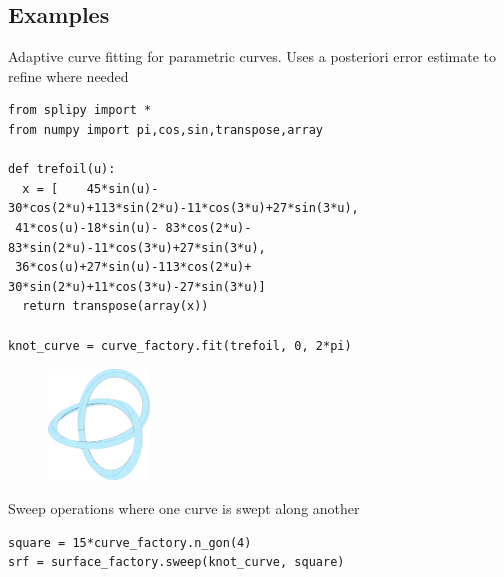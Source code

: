 \documentclass[landscape]{sintefposter}
\begin{document}
\begin{multicols}{3}
\vspace{-.5cm}
\section{Examples}

Adaptive curve fitting for parametric curves.
Uses a posteriori error estimate to refine where needed
\begin{tcolorbox}[colback=sinteflightgrey]
  \begin{Verbatim}[fontsize=\footnotesize]
from splipy import *
from numpy import pi,cos,sin,transpose,array

def trefoil(u):
  x = [    45*sin(u)- 30*cos(2*u)+113*sin(2*u)-11*cos(3*u)+27*sin(3*u),
 41*cos(u)-18*sin(u)- 83*cos(2*u)- 83*sin(2*u)-11*cos(3*u)+27*sin(3*u),
 36*cos(u)+27*sin(u)-113*cos(2*u)+ 30*sin(2*u)+11*cos(3*u)-27*sin(3*u)]
  return transpose(array(x))

knot_curve = curve_factory.fit(trefoil, 0, 2*pi)
  \end{Verbatim}
\end{tcolorbox}

\begin{figure}[ht]
  \begin{center}
    \includegraphics[width=0.24\textwidth]{trefoil}
  \end{center}
\end{figure}
Sweep operations where one curve is swept along another
\begin{tcolorbox}[colback=sinteflightgrey]
  \begin{Verbatim}[fontsize=\footnotesize]
square = 15*curve_factory.n_gon(4)
srf = surface_factory.sweep(knot_curve, square)
  \end{Verbatim}
\end{tcolorbox}





\end{multicols}
\end{document}
